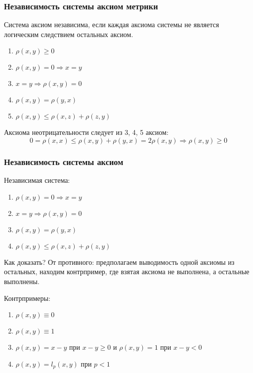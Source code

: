 \documentclass[10pt]{beamer}
\begin{document}
\begin{frame}
\frametitle{Независимость системы аксиом метрики}

Система аксиом независима, если каждая аксиома системы не является логическим следствием остальных аксиом.

\begin{enumerate}
	\item $\rho(x, y) \geqslant 0$
	\item $\rho(x, y) = 0 \Rightarrow x = y$
	\item $x = y \Rightarrow \rho(x, y) = 0$
	\item $\rho(x, y) = \rho(y, x)$
	\item $\rho(x, y) \leqslant \rho(x, z) + \rho(z, y)$
\end{enumerate}

Аксиома неотрицательности следует из 3, 4, 5 аксиом:
\[
0 = \rho(x, x) \leqslant \rho(x, y) + \rho(y, x) = 2\rho(x, y) \Rightarrow \rho(x, y) \geqslant 0
\]
\end{frame}



\begin{frame}
\frametitle{Независимость системы аксиом}

Независимая система:

\begin{enumerate}
	\item $\rho(x, y) = 0 \Rightarrow x = y$
	\item $x = y \Rightarrow \rho(x, y) = 0$
	\item $\rho(x, y) = \rho(y, x)$
	\item $\rho(x, y) \leqslant \rho(x, z) + \rho(z, y)$
\end{enumerate}

Как доказать? От противного: предполагаем выводимость одной аксиомы из остальных, находим контрпример, где взятая аксиома не выполнена, а остальные выполнены.

\vspace{\baselineskip}
Контрпримеры:

\begin{enumerate}
	\item $\rho(x, y)\equiv0$
	\item $\rho(x, y)\equiv1$
	\item $\rho(x, y) = x - y$ при $x - y \geq 0$ и $\rho(x, y) = 1$ при $x - y < 0$
	\item $\rho(x, y) = l_{p}(x, y) $ при $p < 1$
\end{enumerate}
\end{frame}
\end{document}
